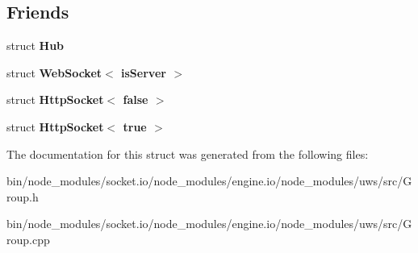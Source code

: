 \subsection*{Friends}
\begin{DoxyCompactItemize}
\item 
\mbox{\label{structu_w_s_1_1_group_af20bcb1dd4e741f2423d470bb4cd994d}} 
struct {\bfseries Hub}
\item 
\mbox{\label{structu_w_s_1_1_group_af442c64c44a1efcec5f214475ecf9b66}} 
struct {\bfseries Web\+Socket$<$ is\+Server $>$}
\item 
\mbox{\label{structu_w_s_1_1_group_a2b5e67441f8f1118b3cbf6ec686c4b44}} 
struct {\bfseries Http\+Socket$<$ false $>$}
\item 
\mbox{\label{structu_w_s_1_1_group_ab830db3189a4a8e913758f6e3e300aff}} 
struct {\bfseries Http\+Socket$<$ true $>$}
\end{DoxyCompactItemize}


The documentation for this struct was generated from the following files\+:\begin{DoxyCompactItemize}
\item 
bin/node\+\_\+modules/socket.\+io/node\+\_\+modules/engine.\+io/node\+\_\+modules/uws/src/Group.\+h\item 
bin/node\+\_\+modules/socket.\+io/node\+\_\+modules/engine.\+io/node\+\_\+modules/uws/src/Group.\+cpp\end{DoxyCompactItemize}

